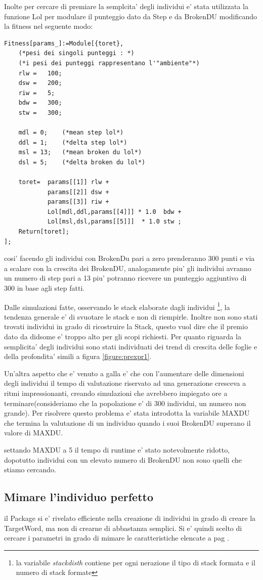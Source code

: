 \documentclass[12pt, a4paper]{article}
\begin{document}
Inolte per cercare di premiare la semplcita' degli individui e' stata utilizzata la funzione Lol per modulare il punteggio dato da Step e da BrokenDU modificando la fitness nel seguente modo:
\begin{lstlisting}
Fitness[params_]:=Module[{toret},
	(*pesi dei singoli punteggi : *)
	(*i pesi dei punteggi rappresentano l'"ambiente"*)
	rlw	=	100;
	dsw	=	200;
	riw	=	5;
	bdw	=	300;
	stw	=	300;

	mdl = 0;	(*mean step lol*) 
	ddl = 1;	(*delta step lol*) 
	msl = 13;	(*mean broken du lol*) 
	dsl = 5;	(*delta broken du lol*) 

	toret=	params[[1]] rlw + 
			params[[2]] dsw + 
			params[[3]] riw +
			Lol[mdl,ddl,params[[4]]] * 1.0  bdw + 
			Lol[msl,dsl,params[[5]]]  * 1.0 stw ;  
	Return[toret];
];
\end{lstlisting}

cosi' facendo gli individui con BrokenDu pari a zero prenderanno 300 punti e via a scalare con la crescita dei BrokenDU, analogamente piu' gli individui avranno un numero di step pari a 13 piu' potranno ricevere un punteggio aggiuntivo di 300 in base agli step fatti.

Dalle simulazioni fatte, osservando le stack elaborate dagli individui
\footnote{la variabile {\itshape stackdisth} contiene per ogni nerazione il tipo di stack formata e il numero di stack formate},
la tendenza generale e' di svuotare le stack e non di riempirle. 
Inoltre non sono stati trovati individui in grado di ricostruire la Stack, questo vuol dire che il premio dato da didsome e' troppo alto per gli scopi richiesti. Per quanto riguarda la semplicita' degli individui sono stati individuati dei trend di crescita delle foglie e della profondita' simili a figura \ref{figure:prexpr1}.

Un'altra aspetto che e' venuto a galla e' che con l'aumentare delle dimensioni degli individui il tempo di valutazione riservato ad una generazione cresceva a ritmi impressionanti, creando simulazioni che avrebbero impiegato ore a terminare(consideriamo che la popolazione e' di 300 individui, un numero non grande). Per risolvere questo problema e' stata introdotta la variabile MAXDU che termina la valutazione di un individuo quando i suoi BrokenDU superano il valore di MAXDU.

settando MAXDU a 5 il tempo di runtime e' stato notevolmente ridotto, dopotutto individui con un elevato numero di BrokenDU non sono quelli che stiamo cercando.


\subsection{Mimare l'individuo perfetto}
il Package si e' rivelato efficiente nella creazione di individui in grado di creare la TargetWord, ma non di crearne di abbastanza semplici. Si e' quindi scelto di cercare i parametri in grado di mimare le caratteristiche elencate a pag \pageref{item:perf}.
\end{document}
